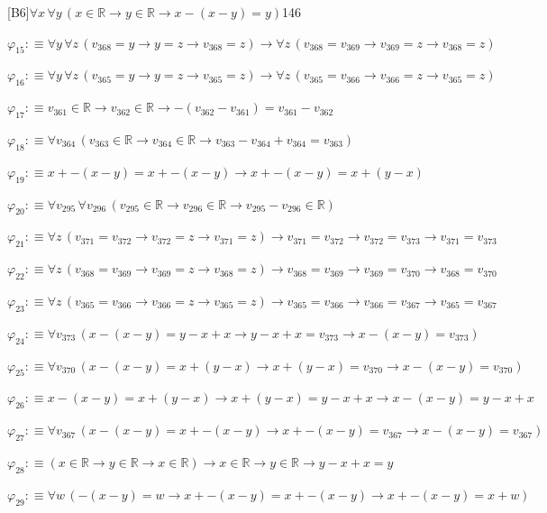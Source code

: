 \begin{fullproof}{[B6]}{$\forall x\,\forall y\,(x \in \mathbb{R} \to y \in \mathbb{R} \to x - (x - y) = y)$}{146}
\begin{abbrevlist}
\item $\varphi_{15} :\equiv \forall y\,\forall z\,(v_{368} = y \to y = z \to v_{368} = z) \to \forall z\,(v_{368} = v_{369} \to v_{369} = z \to v_{368} = z)$
\item $\varphi_{16} :\equiv \forall y\,\forall z\,(v_{365} = y \to y = z \to v_{365} = z) \to \forall z\,(v_{365} = v_{366} \to v_{366} = z \to v_{365} = z)$
\item $\varphi_{17} :\equiv v_{361} \in \mathbb{R} \to v_{362} \in \mathbb{R} \to -(v_{362} - v_{361}) = v_{361} - v_{362}$
\item $\varphi_{18} :\equiv \forall v_{364}\,(v_{363} \in \mathbb{R} \to v_{364} \in \mathbb{R} \to v_{363} - v_{364} + v_{364} = v_{363})$
\item $\varphi_{19} :\equiv x + -(x - y) = x + -(x - y) \to x + -(x - y) = x + (y - x)$
\item $\varphi_{20} :\equiv \forall v_{295}\,\forall v_{296}\,(v_{295} \in \mathbb{R} \to v_{296} \in \mathbb{R} \to v_{295} - v_{296} \in \mathbb{R})$
\item $\varphi_{21} :\equiv \forall z\,(v_{371} = v_{372} \to v_{372} = z \to v_{371} = z) \to v_{371} = v_{372} \to v_{372} = v_{373} \to v_{371} = v_{373}$
\item $\varphi_{22} :\equiv \forall z\,(v_{368} = v_{369} \to v_{369} = z \to v_{368} = z) \to v_{368} = v_{369} \to v_{369} = v_{370} \to v_{368} = v_{370}$
\item $\varphi_{23} :\equiv \forall z\,(v_{365} = v_{366} \to v_{366} = z \to v_{365} = z) \to v_{365} = v_{366} \to v_{366} = v_{367} \to v_{365} = v_{367}$
\item $\varphi_{24} :\equiv \forall v_{373}\,(x - (x - y) = y - x + x \to y - x + x = v_{373} \to x - (x - y) = v_{373})$
\item $\varphi_{25} :\equiv \forall v_{370}\,(x - (x - y) = x + (y - x) \to x + (y - x) = v_{370} \to x - (x - y) = v_{370})$
\item $\varphi_{26} :\equiv x - (x - y) = x + (y - x) \to x + (y - x) = y - x + x \to x - (x - y) = y - x + x$
\item $\varphi_{27} :\equiv \forall v_{367}\,(x - (x - y) = x + -(x - y) \to x + -(x - y) = v_{367} \to x - (x - y) = v_{367})$
\item $\varphi_{28} :\equiv (x \in \mathbb{R} \to y \in \mathbb{R} \to x \in \mathbb{R}) \to x \in \mathbb{R} \to y \in \mathbb{R} \to y - x + x = y$
\item $\varphi_{29} :\equiv \forall w\,(-(x - y) = w \to x + -(x - y) = x + -(x - y) \to x + -(x - y) = x + w)$

\end{abbrevlist}
\end{fullproof}
